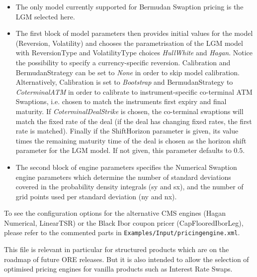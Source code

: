 \documentclass[12pt, a4paper]{article}
\begin{document}
{{\begin{itemize}
\item The only model currently supported for Bermudan Swaption pricing is the LGM selected here. 

\item The first block of model parameters then provides initial values for the model (Reversion, Volatility) and chooses
  the parametrisation of the LGM model with ReversionType and VolatilityType choices {\em HullWhite} and {\em
    Hagan}. Notice the possibility to specify a currency-specific reversion. Calibration and BermudanStrategy can be set
  to {\em None} in order to skip model calibration. Alternatively, Calibration is set to {\em Bootstrap} and
  BermudanStrategy to {\em CoterminalATM} in order to calibrate to instrument-specific co-terminal ATM Swaptions,
  i.e. chosen to match the instruments first expiry and final maturity.  If {\em CoterminalDealStrike} is chosen, the
  co-terminal swaptions will match the fixed rate of the deal (if the deal has changing fixed rates, the first rate is
  matched). Finally if the ShiftHorizon parameter is given, its value times the remaining maturity time of the deal is
  chosen as the horizon shift parameter for the LGM model. If not given, this parameter defaults to $0.5$.

\item The second block of engine parameters specifies the Numerical Swaption engine parameters which determine the
  number of standard deviations covered in the probability density integrals (sy and sx), and the number of grid points
  used per standard deviation (ny and nx).
\end{itemize}

To see the configuration options for the alternative CMS engines (Hagan Numerical, LinearTSR) or the Black Ibor coupon
pricer (CapFlooredIborLeg), please refer to the commented parts in {\tt Examples/Input/pricingengine.xml}.

\medskip
This file is relevant in particular for structured products which are on the roadmap of future ORE releases. But it is also
intended to allow the selection of optimised pricing engines for vanilla products such as Interest Rate Swaps.

}}
\end{document}
